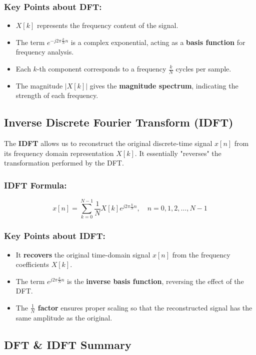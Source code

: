 \documentclass[12pt, letterpaper]{article}
\begin{document}
\subsubsection*{Key Points about DFT:}
\begin{itemize}
    \item \( X[k] \) represents the frequency content of the signal.
    \item The term \( e^{-j 2\pi \frac{k}{N} n} \) is a complex exponential, acting as a \textbf{basis function} for frequency analysis.
    \item Each \( k \)-th component corresponds to a frequency \( \frac{k}{N} \) cycles per sample.
    \item The magnitude \( |X[k]| \) gives the \textbf{magnitude spectrum}, indicating the strength of each frequency.
\end{itemize}

\subsection{Inverse Discrete Fourier Transform (IDFT)}
The \textbf{IDFT} allows us to reconstruct the original discrete-time signal \( x[n] \) from its frequency domain representation \( X[k] \). It essentially "reverses" the transformation performed by the DFT.

\subsubsection*{IDFT Formula:}
\[
x[n] = \sum_{k=0}^{N-1} \frac{1}{N} X[k] e^{j 2\pi \frac{k}{N} n}, \quad n = 0, 1, 2, \dots, N-1
\]

\subsubsection*{Key Points about IDFT:}
\begin{itemize}
    \item It \textbf{recovers} the original time-domain signal \( x[n] \) from the frequency coefficients \( X[k] \).
    \item The term \( e^{j 2\pi \frac{k}{N} n} \) is the \textbf{inverse basis function}, reversing the effect of the DFT.
    \item The \textbf{\( \frac{1}{N} \) factor} ensures proper scaling so that the reconstructed signal has the same amplitude as the original.
\end{itemize}

\subsection{DFT \& IDFT Summary}
\end{document}
